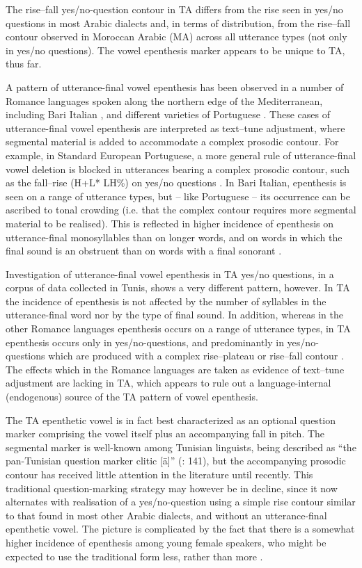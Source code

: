 \documentclass[output=paper]{langsci/langscibook}
\begin{document}
The rise--fall yes/no-question contour in TA differs from the rise seen in yes/no questions in most Arabic dialects \citep{Hellmuthtoappearbook} and, in terms of distribution, from the rise--fall contour observed in Moroccan Arabic (MA) across all utterance types (not only in yes/no questions). The vowel epenthesis marker appears to be unique to TA, thus far.

A pattern of utterance-final vowel epenthesis has been observed in a number of Romance languages spoken along the northern edge of the Mediterranean, including Bari Italian \citep{GriceEtAl2015}, and different varieties of Portuguese \citep{FrotaEtAl2015}. These cases of utterance-final vowel epenthesis are interpreted as text--tune adjustment, where segmental material is added to accommodate a complex prosodic contour.  For example, in Standard European Portuguese, a more general rule of utterance-final vowel deletion is blocked in utterances bearing a complex prosodic contour, such as the fall--rise (H+L* LH\%) on yes/no questions \citep{FrotaEtAl2015}. In Bari Italian, epenthesis is seen on a range of utterance types, but – like Portuguese – its occurrence can be ascribed to tonal crowding (i.e. that the complex contour requires more segmental material to be realised). This is reflected in higher incidence of epenthesis on utterance-final monosyllables than on longer words, and on words in which the final sound is an obstruent than on words with a final sonorant \citep{GriceEtAl2015}.

Investigation of utterance-final vowel epenthesis in TA yes/no questions, in a corpus of data collected in Tunis, shows a very different pattern, however. In TA the incidence of epenthesis is not affected by the number of syllables in the utterance-final word nor by the type of final sound. In addition, whereas in the other Romance languages epenthesis occurs on a range of utterance types, in TA epenthesis occurs only in yes/no-questions, and predominantly in yes/no-questions which are produced with a complex rise--plateau or rise--fall contour \citep{Hellmuthforthcomingtunisianyesno}. The effects which in the Romance languages are taken as evidence of text--tune adjustment are lacking in TA, which appears to rule out a language-internal (endogenous) source of the TA pattern of vowel epenthesis.

The TA epenthetic vowel is in fact best characterized as an optional question marker comprising the vowel itself plus an accompanying fall in pitch. The segmental marker is well-known among Tunisian linguists, being described as “the pan-Tunisian question marker clitic [ā]” (\citealt{HerinZammit2017}: 141), but the accompanying prosodic contour has received little attention in the literature until recently. This traditional question-marking strategy may however be in decline, since it now alternates with realisation of a yes/no-question using a simple rise contour similar to that found in most other Arabic dialects, and without an utterance-final epenthetic vowel. The picture is complicated by the fact that there is a somewhat higher incidence of epenthesis among young female speakers, who might be expected to use the traditional form less, rather than more \citep{Hellmuthforthcomingtunisianyesno}. 
\end{document}
